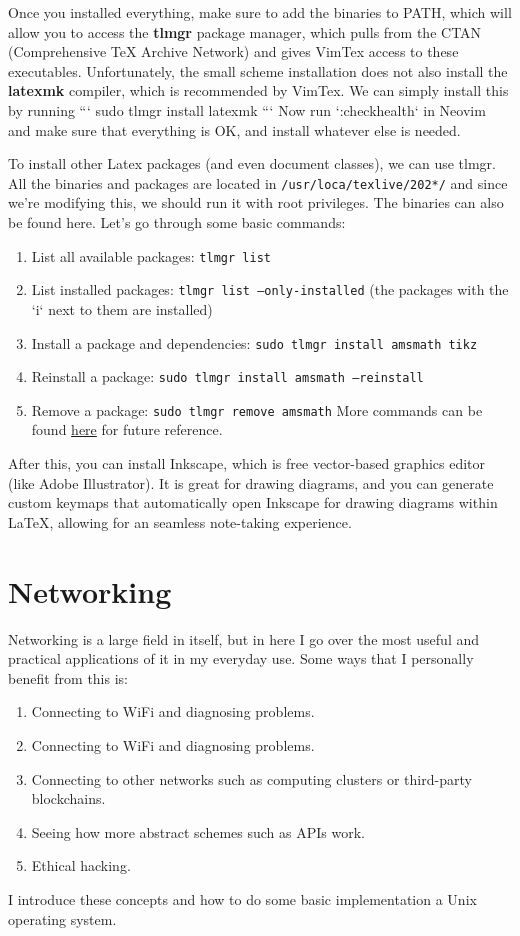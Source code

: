 \documentclass{article}
\theoremstyle{definition}
\begin{document}
  Once you installed everything, make sure to add the binaries to PATH, which will allow you to access the \textbf{tlmgr} package manager, which pulls from the CTAN (Comprehensive TeX Archive Network) and gives VimTex access to these executables. Unfortunately, the small scheme installation does not also install the \textbf{latexmk} compiler, which is recommended by VimTex. We can simply install this by running 
  ```
  sudo tlmgr install latexmk
  ```
  Now run `:checkhealth` in Neovim and make sure that everything is OK, and install whatever else is needed. 


  To install other Latex packages (and even document classes), we can use tlmgr. All the binaries and packages are located in \texttt{/usr/loca/texlive/202*/} and since we're modifying this, we should run it with root privileges. The binaries can also be found here. Let's go through some basic commands: 
  \begin{enumerate}
    \item List all available packages: \texttt{tlmgr list}
    \item List installed packages: \texttt{tlmgr list --only-installed} (the packages with the `i` next to them are installed)
    \item Install a package and dependencies: \texttt{sudo tlmgr install amsmath tikz} 
    \item Reinstall a package: \texttt{sudo tlmgr install amsmath --reinstall}
    \item Remove a package: \texttt{sudo tlmgr remove amsmath} 
  More commands can be found \href{http://tug.ctan.org/info/tlmgrbasics/doc/tlmgr.pdf}{here} for future reference.  
  \end{enumerate}

  After this, you can install Inkscape, which is free vector-based graphics editor (like Adobe Illustrator). It is great for drawing diagrams, and you can generate custom keymaps that automatically open Inkscape for drawing diagrams within LaTeX, allowing for an seamless note-taking experience.  
    
\section{Networking}

  Networking is a large field in itself, but in here I go over the most useful and practical applications of it in my everyday use. Some ways that I personally benefit from this is:

  \begin{enumerate}
    \item Connecting to WiFi and diagnosing problems.  
    \item Connecting to WiFi and diagnosing problems. 
    \item Connecting to other networks such as computing clusters or third-party blockchains.  
    \item Seeing how more abstract schemes such as APIs work. 
    \item Ethical hacking. 
  \end{enumerate}
  I introduce these concepts and how to do some basic implementation a Unix operating system.
\end{document}
